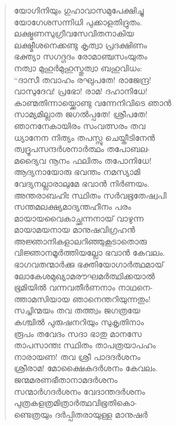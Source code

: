 \begin{verse}
യോഗിനിയും ഗുഹാവാസമുപേക്ഷിച്ചു\\
യോഗേശസന്നിധി പുക്കാളതിദ്രുതം.\\
ലക്ഷ്മണസുഗ്രീവസേവിതനാകിയ\\
ലക്ഷ്മീശനെക്കണ്ടു കൃത്വാ പ്രദക്ഷിണം\\
ഭക്ത്യാ സഗദ്ഗദം രോമാഞ്ചസംയുതം\\
നത്വാ മുഹുര്‍മുഹുസ്തുത്വാ ബഹുവിധം:\\
“ദാസീ തവാഹം രഘുപതേ! രാജേന്ദ്ര!\\
വാസുദേവ! പ്രഭോ! രാമ! ദഹാനിധേ!\\
കാണ്മതിന്നായ്ക്കൊണ്ടു വന്നേനിവിടെ ഞാന്‍\\
സാമ്യമില്ലാത ജഗല്‍പ്പതേ! ശ്രീപതേ!\\
ഞാനനേകായിരം സംവത്സരം തവ\\
ധ്യാനേന നിത്യം തപസ്സു ചെയ്തീടിനേന്‍\\
ത്വദ്രൂപസന്ദര്‍ശനാര്‍ത്ഥം തപോബല-\\
മദ്യൈവ നൂനം ഫലിതം തപോനിധേ!\\
ആദ്യനായോരു ഭവന്തം നമസ്യാമി\\
വേദ്യനല്ലാരാലുമേ ഭവാന്‍ നിര്‍ണയം.\\
അന്തരാ‍ബഹിഃ സ്ഥിതം സര്‍വഭൂതേഷ്വപി\\
സന്തമലക്ഷ്യമാദ്യന്തഹീനം പരം\\
മായായവൈകാച്ഛന്നനായ് വാഴുന്ന\\
മായാമയനായ മാനുഷവിഗ്രഹന്‍\\
അജ്ഞാനികളാലറിഞ്ഞുകൂടാതൊരു\\
വിജ്ഞാനമൂര്‍ത്തിയല്ലോ ഭവാന്‍ കേവലം.\\
ഭാഗവതന്മാര്‍ക്കു ഭക്തിയോഗാര്‍ത്ഥമായ്\\
ലോകേശമുഖ്യാമരൗഘമര്‍ത്ഥിക്കയാല്‍\\
ഭൂമിയില്‍ വന്നവതീര്‍ണനാം നാഥനെ-\\
ത്താമസിയായ ഞാനെന്തറിയുന്നതും!\\
സച്ചിന്മയം തവ തത്ത്വം ജഗത്രയേ\\
കശ്ചില്‍ പുരുഷനറിയും സുകൃതിനാം\\
രൂപം തവേദം സദാ ഭാതു മാനസേ\\
താപസാന്തഃ സ്ഥിതം താപത്രയാപഹം\\
നാരായണ! തവ ശ്രീ പാദദര്‍ശനം\\
ശ്രീരാമ! മോക്ഷൈകദര്‍ശനം കേവലം.\\
ജന്മമരണഭീതാനാമദര്‍ശനം\\
സന്മാര്‍ഗദര്‍ശനം വേദാന്തദര്‍ശനം\\
പുത്രകളത്രമിത്രാര്‍ത്ഥവിഭൂതികൊ-\\
ണ്ടെത്രയും ദര്‍പ്പിതരായുള്ള മാനുഷര്‍\\

\end{verse}
